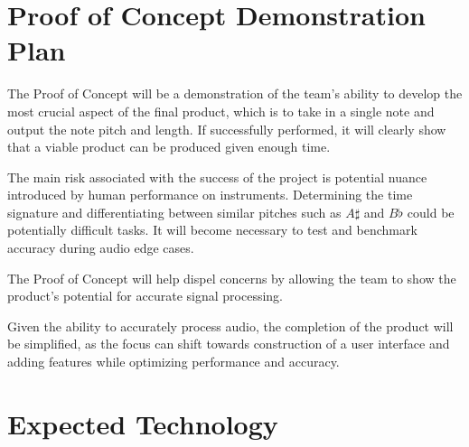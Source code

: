 \documentclass{article}
\begin{document}
\section{Proof of Concept Demonstration Plan}

The Proof of Concept will be a demonstration of the team’s ability to develop the most crucial aspect of the final product, which is to take in a single note and output the note pitch and length. If successfully performed, it will clearly show that a viable product can be produced given enough time. 

The main risk associated with the success of the project is potential nuance introduced by human performance on instruments. Determining the time signature and differentiating between similar pitches such as \( A\sharp \) and \( B\flat \) could be potentially difficult tasks. It will become necessary to test and benchmark accuracy during audio edge cases. 

The Proof of Concept will help dispel concerns by allowing the team to show the product's potential for accurate signal processing.

Given the ability to accurately process audio, the completion of the product will be simplified, as the focus can shift towards construction of a user interface and adding features while optimizing performance and accuracy.

\section{Expected Technology}
\end{document}
